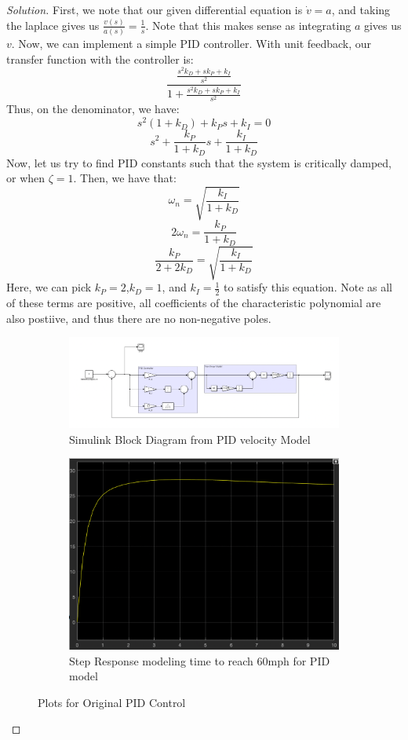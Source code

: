 \documentclass{article}
\begin{document}
\begin{proof}[Solution]
First, we note that our given differential equation is $\dot{v}=a$, and taking the laplace gives us $\frac{v(s)}{a(s)}=\frac{1}{s}$.
Note that this makes sense as integrating $a$ gives us $v$. \newline
Now, we can implement a simple PID controller. With unit feedback, our transfer function with the controller is:
\[\dfrac{\frac{s^2k_{D}+sk_{P}+k_{I}}{s^2}}{1+\frac{s^2k_{D}+sk_{P}+k_{I}}{s^2}}
\]
Thus, on the denominator, we have: 
\[s^2(1+k_{D})+k_{P}s+k_{I}=0
\]
\[s^2+\frac{k_{P}}{1+k_{D}}s+\frac{k_{I}}{1+k_{D}}
\]
Now, let us try to find PID constants such that the system is critically damped, or when $\zeta=1$.
Then, we have that:
\[\omega_{n} = \sqrt{\frac{k_{I}}{1+k_{D}}}\]
\[2\omega_{n}=\frac{k_{P}}{1+k_{D}}\]
\[\frac{k_{P}}{2+2k_{D}} =  \sqrt{\frac{k_{I}}{1+k_{D}}}\]
Here, we can pick $k_P=2$,$k_D=1$, and $k_I=\frac{1}{2}$ to satisfy this equation. Note as all of these terms are positive, all coefficients of the characteristic polynomial are also postiive, and thus there are no non-negative poles.

\begin{figure}[h!]
    \centering
    \begin{subfigure}{0.4\linewidth}
      \includegraphics[width=\linewidth]{Q3Model.png}
      \caption{Simulink Block Diagram from PID velocity Model}
    \end{subfigure}
    \begin{subfigure}{0.4\linewidth}
      \includegraphics[width=\linewidth]{img12.png}
      \caption{Step Response modeling time to reach 60mph for PID model}
    \end{subfigure}
    \caption{Plots for Original PID Control}
  \end{figure}


\end{proof}
\end{document}
